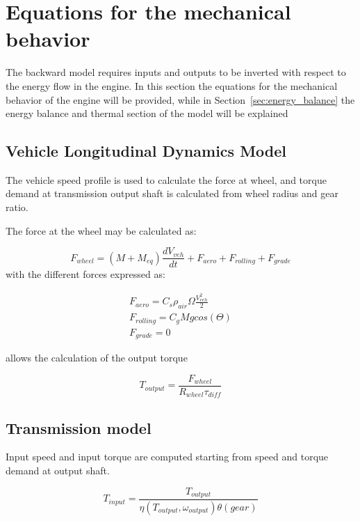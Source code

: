 \section{Equations for the mechanical behavior}

The backward model requires inputs and outputs to be inverted with respect to the energy flow in the engine. In this section the equations for the mechanical behavior of the engine will be provided, while in Section~\ref{sec:energy_balance} the energy balance and thermal section of the model will be explained

\subsection{Vehicle Longitudinal Dynamics Model}

The vehicle speed profile is used to calculate the force at wheel, and torque demand at transmission output shaft is calculated from wheel radius and gear ratio.

The force at the wheel may be calculated as:

\begin{equation}
  F_{wheel}=(M+M_{eq})\frac{dV_{veh}}{dt}+F_{aero}+F_{rolling}+F_{grade}
\end{equation}
with the different forces expressed as:

\begin{gather*}
    F_{aero} = C_{s}\rho_{air}\Omega \frac{V^{2}_{veh}}{2} \\
    F_{rolling} = C_{g}M g cos(\Theta) \\
    F_{grade} = 0
\end{gather*}


allows the calculation of the output torque

\begin{equation}
  T_{output}=\frac{F_{wheel}}{R_{wheel}\tau_{diff}}
\end{equation}

\subsection{Transmission model}

Input speed and input torque are computed starting from speed and torque demand at output shaft.

\begin{equation}
  T_{input}=\frac{T_{output}}{\eta(T_{output},\omega_{output})\theta(gear)}
\end{equation}

